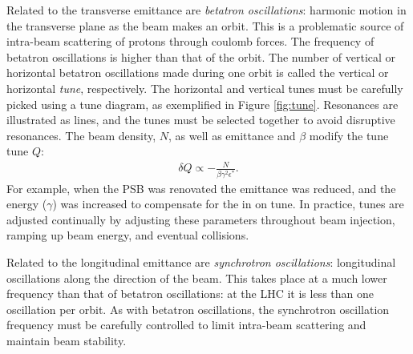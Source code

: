 Related to the transverse emittance are \emph{betatron oscillations}: harmonic motion in the transverse plane as the beam makes an orbit.\cite{pdgAccelSection}
This is a problematic source of intra-beam scattering of protons through coulomb forces.
The frequency of betatron oscillations is higher than that of the orbit.
The number of vertical or horizontal betatron oscillations made during one orbit is called the vertical or horizontal \emph{tune}, respectively.
The horizontal and vertical tunes must be carefully picked using a tune diagram, as exemplified in Figure \ref{fig:tune}.
Resonances are illustrated as lines, and the tunes must be selected together to avoid disruptive resonances.
The beam density, $N$, as well as emittance and $\beta$ modify the tune tune $Q$:
\begin{equation}\begin{split}
    \delta Q\propto-\frac{N}{\beta\gamma^2\epsilon^*}.
\end{split}\end{equation} 
For example, when the PSB was renovated the emittance was reduced, and the energy ($\gamma$) was increased to compensate for the in on tune.
In practice, tunes are adjusted continually by adjusting these parameters throughout beam injection, ramping up beam energy, and eventual collisions.

Related to the longitudinal emittance are \emph{synchrotron oscillations}: longitudinal oscillations along the direction of the beam.
This takes place at a much lower frequency than that of betatron oscillations: at the LHC it is less than one oscillation per orbit.
As with betatron oscillations, the synchrotron oscillation frequency must be carefully controlled to limit intra-beam scattering and maintain beam stability.\cite{pdgAccelSection}

